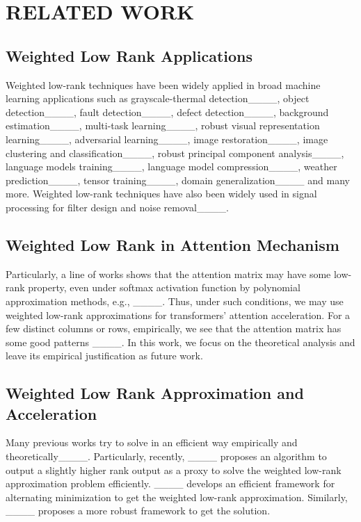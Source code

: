 \section{RELATED WORK}
\label{sec:related}

\subsection{Weighted Low Rank Applications}
Weighted low-rank techniques have been widely applied in broad machine learning applications such as grayscale-thermal detection____, object detection____, fault detection____, defect detection____, background estimation____, multi-task learning____, robust visual representation learning____, adversarial learning____, image restoration____, image clustering and classification____, robust principal component analysis____, language models training____, language model compression____, weather prediction____, tensor training____, domain generalization____ and many more.
Weighted low-rank techniques have also been widely used in signal processing for filter design and noise removal____. 

\subsection{Weighted Low Rank in Attention Mechanism} Particularly, a line of works shows that the attention matrix may have some low-rank property, even under softmax activation function by polynomial approximation methods, e.g., ____. Thus, under such conditions, we may use weighted low-rank approximations for transformers' attention acceleration. For a few distinct columns or rows, empirically, we see that the attention matrix has some good patterns ____. In this work, we focus on the theoretical analysis and leave its empirical justification as future work.

\subsection{Weighted Low Rank Approximation and Acceleration}
Many previous works try to solve in an efficient way empirically and theoretically____. Particularly, recently, ____ proposes an algorithm to output a slightly higher rank output as a proxy to solve the weighted low-rank approximation problem efficiently.
____ develops an efficient framework for alternating minimization to get the weighted low-rank approximation. Similarly, ____ proposes a more robust framework to get the solution. 



